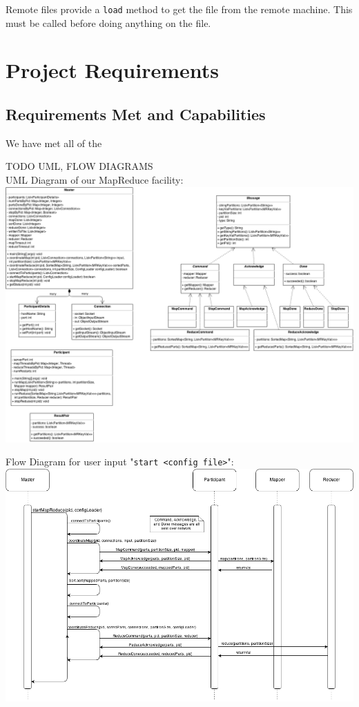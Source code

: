 \documentclass[12pt]{article}
\newcommand{\ttt}{\texttt}
\begin{document}
Remote files provide a \ttt{load} method to get the file from the remote machine. This must be called before doing anything on the file.

\section{Project Requirements}

\subsection{Requirements Met and Capabilities}

We have met all of the 

TODO UML, FLOW DIAGRAMS\\
\newpage
UML Diagram of our MapReduce facility: \\
\includegraphics[scale=.35]{MapReduce_UML.png}

\newpage
Flow Diagram for user input "\verb|start <config file>|": \\
\includegraphics[scale=.5]{MapReduce_start.png}
\end{document}
